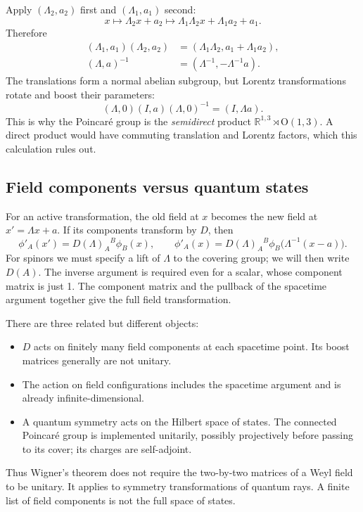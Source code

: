 \documentclass[11pt]{article}
\newcommand{\R}{\mathbb{R}}
\newcommand{\OO}{\mathrm{O}}
\begin{document}
Apply \((\Lambda_2,a_2)\) first and \((\Lambda_1,a_1)\) second:
\[
 x\longmapsto\Lambda_2x+a_2
 \longmapsto\Lambda_1\Lambda_2x+\Lambda_1a_2+a_1.
\]
Therefore
\begin{equation}
 \begin{split}
 (\Lambda_1,a_1)(\Lambda_2,a_2)
   &=(\Lambda_1\Lambda_2,a_1+\Lambda_1a_2),\\
 (\Lambda,a)^{-1}&=(\Lambda^{-1},-\Lambda^{-1}a).
 \end{split}
 \label{eq:group-law}
\end{equation}
The translations form a normal abelian subgroup, but Lorentz
transformations rotate and boost their parameters:
\[
 (\Lambda,0)(I,a)(\Lambda,0)^{-1}=(I,\Lambda a).
\]
This is why the Poincar\'e group is the \emph{semidirect} product
\(\R^{1,3}\rtimes\OO(1,3)\). A direct product would have commuting
translation and Lorentz factors, which this calculation rules out.

\subsection{Field components versus quantum states}
For an active transformation, the old field at \(x\) becomes the new
field at \(x'=\Lambda x+a\). If its components transform by \(D\), then
\begin{equation}
 \phi'_A(x')=D(\Lambda)_A{}^B\phi_B(x),\qquad
 \boxed{\phi'_A(x)=D(\Lambda)_A{}^B
 \phi_B\bigl(\Lambda^{-1}(x-a)\bigr).}
 \label{eq:field-action}
\end{equation}
For spinors we must specify a lift of \(\Lambda\) to the covering group;
we will then write \(D(A)\). The inverse argument is required even for
a scalar, whose component matrix is just 1. The component matrix and the
pullback of the spacetime argument together give the full field transformation.

There are three related but different objects:
\begin{itemize}
\item \(D\) acts on finitely many field components at each spacetime point.
Its boost matrices generally are not unitary.
\item The action on field configurations includes the spacetime argument
and is already infinite-dimensional.
\item A quantum symmetry acts on the Hilbert space of states. The connected
Poincar\'e group is implemented unitarily, possibly projectively before
passing to its cover; its charges are self-adjoint.
\end{itemize}
Thus Wigner's theorem does not require the two-by-two matrices of a
Weyl field to be unitary. It applies to symmetry transformations of
quantum rays. A finite list of field components is not the full space of states.
\end{document}
